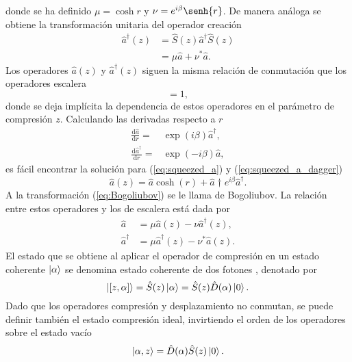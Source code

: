 donde se ha definido $\mu = \cosh{r}$ y $\nu = e^{i\beta}\senh{r}$. De manera análoga se obtiene la transformación unitaria del operador creación
\begin{align}
  \hat{a}^{\dagger}(z) & = \hat{S}(z)\hat{a}^{\dagger} \hat{S}(z) \nonumber         \\
                       & = \mu\hat{a} + \nu^* \hat{a}. \label{eq:squeezed_a_dagger}
\end{align}
Los operadores $\hat{a}(z)$ y $\hat{a}^{\dagger}(z)$ siguen la misma relación de conmutación que los operadores escalera
\begin{equation}
  [\hat{a}(z), \hat{a}^{\dagger}(z)] = 1,
\end{equation}
donde se deja implícita la dependencia de estos operadores en el parámetro de compresión $z$. Calculando las derivadas respecto a $r$
\begin{align}
  \frac{\text{d}\hat{a}}{\text{d}r} =           & \exp(i\beta) \hat{a}^{\dagger}, \\
  \frac{\text{d}\hat{a}^{\dagger}}{\text{d}r} = & \exp(-i\beta) \hat{a},
\end{align}
es fácil encontrar la solución para (\ref{eq:squeezed_a}) y (\ref{eq:squeezed_a_dagger})
\begin{equation}\label{eq:Bogoliubov}
  \hat{a}(z) = \hat{a}\cosh(r) + \hat{a}\dagger e^{i\beta}\hat{a}^{\dagger}.
\end{equation}
A la transformación (\ref{eq:Bogoliubov}) se le llama de Bogoliubov. La relación entre estos operadores y los de escalera está dada por
\begin{align}
  \hat{a}           & = \mu \hat{a}(z) - \nu \hat{a}^{\dagger}(z),   \\
  \hat{a}^{\dagger} & = \mu \hat{a}^{\dagger}(z) - \nu^* \hat{a}(z).
\end{align}
El estado que se obtiene al aplicar el operador de compresión en un estado coherente $\ket{\alpha}$ se denomina estado coherente de dos fotones \cite{Mandel}, denotado por
\begin{equation}
  \ket{[z,\alpha]} = \hat{S}(z)\ket{\alpha} = \hat{S}(z)\hat{D}(\alpha)\ket{0}.
\end{equation}
Dado que los operadores compresión y desplazamiento no conmutan, se puede definir también el estado compresión ideal, invirtiendo el orden de los operadores sobre el estado vacío \cite{Loudon}
\begin{equation}
  \ket{\alpha, z} = \hat{D}(\alpha) \hat{S}(z) \ket{0}.
\end{equation}
